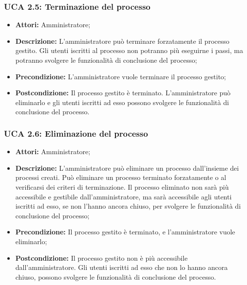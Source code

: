 \subsubsection{UCA 2.5: Terminazione del processo}
\begin{itemize}
\item \textbf{Attori:} Amministratore;
\item \textbf{Descrizione:}
L'amministratore può terminare forzatamente il processo gestito. Gli utenti iscritti al processo non potranno più eseguirne i passi, ma potranno svolgere le funzionalità di conclusione del processo;
\item \textbf{Precondizione:}
L'amministratore vuole terminare il processo gestito;
\item \textbf{Postcondizione:}
Il processo gestito è terminato. L'amministratore può eliminarlo e gli utenti iscritti ad esso possono svolgere le funzionalità di conclusione del processo.
\end{itemize}

\hypertarget{A2.6}{}
\subsubsection{UCA 2.6: Eliminazione del processo}
\begin{itemize}
\item \textbf{Attori:} Amministratore;
\item \textbf{Descrizione:}
L'amministratore può eliminare un processo dall'insieme dei processi creati.
Può eliminare un processo terminato forzatamente o al verificarsi dei criteri di terminazione.
Il processo eliminato non sarà più accessibile e gestibile dall'amministratore, ma sarà accessibile agli utenti iscritti ad esso, se non l'hanno ancora chiuso, per svolgere le funzionalità di conclusione del processo;
\item \textbf{Precondizione:}
Il processo gestito è terminato, e l'amministratore vuole eliminarlo;
\item \textbf{Postcondizione:}
Il processo gestito non è più accessibile dall'amministratore. Gli utenti iscritti ad esso che non lo hanno ancora chiuso, possono svolgere le funzionalità di conclusione del processo.
\end{itemize}